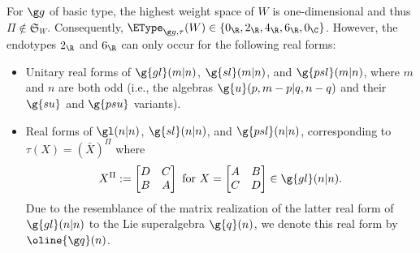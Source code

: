 \documentclass[12pt]{amsart}
\begin{document}
For $\g g$ of basic type, the highest weight space of $W$ is one-dimensional and thus $\Pi\not \in \mathfrak S_W$.
Consequently,  $\EType_{\g g,\tau}(W)\in\{0_\R,2_\R,4_\R,6_\R, 0_\C\}$. However, the endotypes $2_\R$ and $6_\R$ can only occur for the following real forms:
\begin{itemize}
\item[(i)] Unitary real forms of $\g{gl}(m|n)$, $\g{sl}(m|n)$, and $\g{psl}(m|n)$, where $m$ and $n$ are both odd (i.e., the algebras $\g{u}(p,m-p|q,n-q)$ and their $\g{su}$ and $\g{psu}$ variants). 

\item[(ii)] Real forms of $\gl(n|n)$,
$\g{sl}(n|n)$, and $\g{psl}(n|n)$,  corresponding to $\tau(X)=(\bar X)^\Pi$ 
where 
\[
X^\Pi:=\begin{bmatrix}
D & C\\
B & A
\end{bmatrix}
\text{ for }X=\begin{bmatrix}
A& B\\C & D\end{bmatrix}\in\g{gl}(n|n).
\]
Due to the resemblance of the matrix realization of the latter real form of $\g{gl}(n|n)$  to the  Lie superalgebra $\g{q}(n)$,
we denote this real form by $\oline{\g q}(n)$.
\end{itemize}
\end{document}
